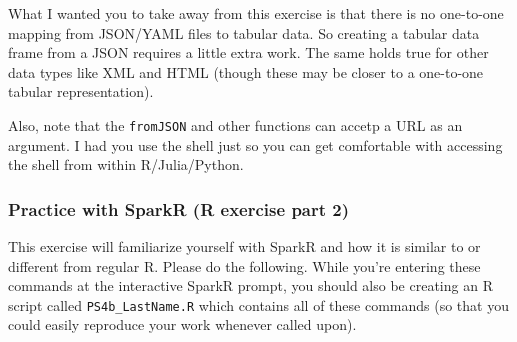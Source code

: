 \documentclass[12pt,english]{exam}
\begin{document}
\begin{questions}
What I wanted you to take away from this exercise is that there is no one-to-one mapping from JSON/YAML files to tabular data. So creating a tabular data frame from a JSON requires a little extra work. The same holds true for other data types like XML and HTML (though these may be closer to a one-to-one tabular representation).

Also, note that the \texttt{fromJSON} and other functions can accetp a URL as an argument. I had you use the shell just so you can get comfortable with accessing the shell from within R/Julia/Python.

\subsubsection*{Practice with SparkR (R exercise part 2)}

\question This exercise will familiarize yourself with SparkR and how it is similar to or different from regular R. Please do the following. While you're entering these commands at the interactive SparkR prompt, you should also be creating an R script called \texttt{PS4b\_LastName.R} which contains all of these commands (so that you could easily reproduce your work whenever called upon).


\end{questions}
\end{document}
